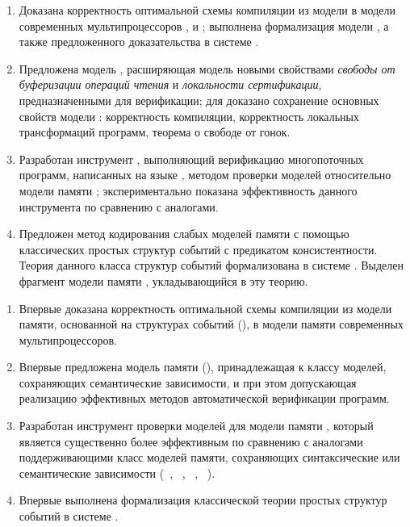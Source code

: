 {}
\begin{enumerate}[beginpenalty=10000] %

  \item Доказана корректность оптимальной схемы компиляции из модели \Wkm
    в модели современных мультипроцессоров \TSO, \ARM и \POWER;
    выполнена формализация модели \Wkm, а также  предложенного доказательства  в системе \coq.

  \item Предложена модель \WkmS, расширяющая модель \Wkm 
    новыми свойствами \emph{свободы от буферизации операций чтения}
    и \emph{локальности сертификации}, предназначенными для верификации;
    для \WkmS доказано сохранение основных свойств модели \Wkm: корректность компиляции,
    корректность локальных трансформаций программ,
    теорема о свободе от гонок.

  \item Разработан инструмент \wmc, выполняющий верификацию многопоточных программ, 
    написанных на языке \CLANG, методом проверки моделей относительно модели памяти \WkmS;
    экспериментально показана эффективность данного инструмента по сравнению с аналогами.

  \item Предложен метод кодирования слабых моделей памяти 
    с помощью классических простых структур событий с предикатом консистентности.
    Теория данного класса структур событий формализована в системе \coq.
    Выделен фрагмент модели памяти \Wkm, укладывающийся в эту теорию. 

\end{enumerate}


{\novelty}
\begin{enumerate}[beginpenalty=10000] %

  \item Впервые доказана корректность оптимальной схемы компиляции
    из модели памяти, основанной на структурах событий (\Wkm), 
    в модели памяти современных мультипроцессоров.

  \item Впервые предложена модель памяти (\WkmS),
    принадлежащая к классу моделей, сохраняющих семантические зависимости, 
    и при этом допускающая реализацию эффективных методов автоматической верификации программ. 

  \item Разработан инструмент проверки моделей \wmc для модели памяти \WkmS,
    который является существенно более эффективным по сравнению с аналогами 
    поддерживающими класс моделей памяти, 
    сохраняющих синтаксические или семантические зависимости
    (\hmc~\autocite{Kokologiannakis-Vafeiadis:ASPLOS2020},
     \rmem~\autocite{Pulte-al:PLDI2019},
     \Nidhugg~\autocite{Abdulla-al:TACAS2015,Abdulla-al:CAV2016},
     \CDSChecker~\autocite{Norris-Demsky:OOPSLA2013}).

  \item Впервые выполнена формализация классической теории 
    простых структур событий в системе \coq. 

\end{enumerate}

